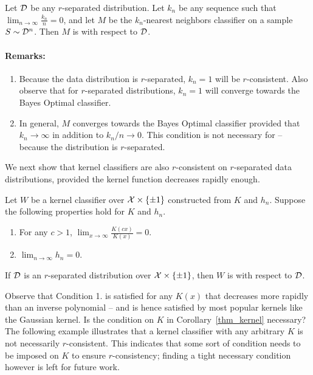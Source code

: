 \begin{cor}\label{nn_sep_thm}
Let ${\mathcal D}$ be any $r$-separated distribution. Let $k_n$ be any sequence such that $\lim_{n \to \infty} \frac{k_n}{n} = 0$, and let $M$ be the $k_n$-nearest neighbors classifier on a sample $S \sim {\mathcal D}^n$. Then $M$ is \rcons\emph{ }with respect to ${\mathcal D}$. 
\end{cor}

\paragraph{\textbf{Remarks:}}
\begin{enumerate}
	\item Because the data distribution is $r$-separated, $k_n = 1$ will be $r$-consistent. Also observe that for $r$-separated distributions, $k_n = 1$ will converge towards the Bayes Optimal classifier.
	\item In general, $M$ converges towards the Bayes Optimal classifier provided that $k_n \to \infty$ in addition to $k_n /n \to 0$. This condition is not necessary for \rconsy -- because the distribution is $r$-separated. 
\end{enumerate}



We next show that kernel classifiers are also $r$-consistent on $r$-separated data distributions, provided the kernel function decreases rapidly enough. 

\begin{cor}\label{thm_kernel}
Let $W$ be a kernel classifier over $\mathcal X \times \{\pm 1\}$ constructed from $K$ and $h_n$. Suppose the following properties hold for $K$ and $h_n$.
\begin{enumerate}
	\item For any $c > 1$, $\lim_{x \to \infty} \frac{K(cx)}{K(x)} = 0.$
	\item $\lim_{n \to \infty} h_n = 0.$
\end{enumerate}
If ${\mathcal D}$ is an $r$-separated distribution over $\mathcal X \times \{\pm 1\}$, then $W$ is \rcons\emph{ }with respect to ${\mathcal D}$. 
\end{cor}

Observe that Condition 1. is satisfied for any $K(x)$ that decreases more rapidly than an inverse polynomial -- and is hence satisfied by most popular kernels like the Gaussian kernel. Is the condition on $K$ in Corollary~\ref{thm_kernel} necessary? The following example illustrates that a kernel classifier with any arbitrary $K$ is not necessarily $r$-consistent. This indicates that some sort of condition needs to be imposed on $K$ to ensure $r$-consistency; finding a tight necessary condition however is left for future work. 

